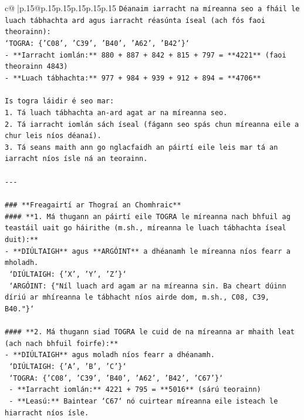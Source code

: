 \documentclass{article}
\begin{document}
{\begin{supertabular}{c@{$\;$}|p{.15\linewidth}@{}p{.15\linewidth}p{.15\linewidth}p{.15\linewidth}p{.15\linewidth}p{.15\linewidth}}
{{{\texttt{Déanaim iarracht na míreanna seo a fháil le luach tábhachta ard agus iarracht réasúnta íseal (ach fós faoi theorainn):} \\
\texttt{`TOGRA: \{'C08', 'C39', 'B40', 'A62', 'B42'\}`} \\
\texttt{{-} **Iarracht iomlán:** 880 + 887 + 842 + 815 + 797 = **4221** (faoi theorainn 4843)} \\
\texttt{{-} **Luach tábhachta:** 977 + 984 + 939 + 912 + 894 = **4706**} \\
\\ 
\texttt{Is togra láidir é seo mar:} \\
\texttt{1. Tá luach tábhachta an{-}ard agat ar na míreanna seo.} \\
\texttt{2. Tá iarracht iomlán sách íseal (fágann seo spás chun míreanna eile a chur leis níos déanaí).} \\
\texttt{3. Tá seans maith ann go nglacfaidh an páirtí eile leis mar tá an iarracht níos ísle ná an teorainn.} \\
\\ 
\texttt{{-}{-}{-}} \\
\\ 
\texttt{\#\#\# **Freagairtí ar Thograí an Chomhraic**} \\
\texttt{\#\#\#\# **1. Má thugann an páirtí eile TOGRA le míreanna nach bhfuil ag teastáil uait go háirithe (m.sh., míreanna le luach tábhachta íseal duit):**} \\
\texttt{{-} **DIÚLTAIGH** agus **ARGÓINT** a dhéanamh le míreanna níos fearr a mholadh.} \\
\texttt{  `DIÚLTAIGH: \{'X', 'Y', 'Z'\}`} \\
\texttt{  `ARGÓINT: \{"Níl luach ard agam ar na míreanna sin. Ba cheart dúinn díriú ar mhíreanna le tábhacht níos airde dom, m.sh., C08, C39, B40."\}`} \\
\\ 
\texttt{\#\#\#\# **2. Má thugann siad TOGRA le cuid de na míreanna ar mhaith leat (ach nach bhfuil foirfe):**} \\
\texttt{{-} **DIÚLTAIGH** agus moladh níos fearr a dhéanamh.} \\
\texttt{  `DIÚLTAIGH: \{'A', 'B', 'C'\}`} \\
\texttt{  `TOGRA: \{'C08', 'C39', 'B40', 'A62', 'B42', 'C67'\}`} \\
\texttt{  {-} **Iarracht iomlán:** 4221 + 795 = **5016** (sárú teorainn)} \\
\texttt{  {-} **Leasú:** Baintear `C67` nó cuirtear míreanna eile isteach le hiarracht níos ísle.} \\
}}}
\end{supertabular}}
\end{document}
